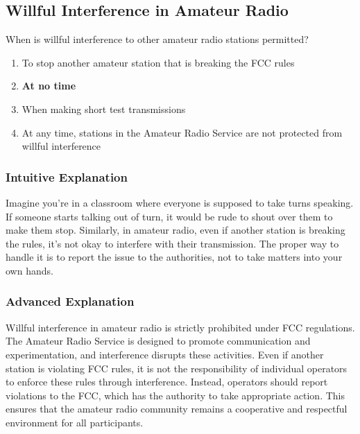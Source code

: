 \subsection{Willful Interference in Amateur Radio}
\label{T1A11}

\begin{tcolorbox}[colback=gray!10!white,colframe=black!75!black,title=T1A11]
When is willful interference to other amateur radio stations permitted?
\begin{enumerate}[label=\Alph*,noitemsep]
    \item To stop another amateur station that is breaking the FCC rules
    \item \textbf{At no time}
    \item When making short test transmissions
    \item At any time, stations in the Amateur Radio Service are not protected from willful interference
\end{enumerate}
\end{tcolorbox}

\subsubsection*{Intuitive Explanation}
Imagine you're in a classroom where everyone is supposed to take turns speaking. If someone starts talking out of turn, it would be rude to shout over them to make them stop. Similarly, in amateur radio, even if another station is breaking the rules, it's not okay to interfere with their transmission. The proper way to handle it is to report the issue to the authorities, not to take matters into your own hands.

\subsubsection*{Advanced Explanation}
Willful interference in amateur radio is strictly prohibited under FCC regulations. The Amateur Radio Service is designed to promote communication and experimentation, and interference disrupts these activities. Even if another station is violating FCC rules, it is not the responsibility of individual operators to enforce these rules through interference. Instead, operators should report violations to the FCC, which has the authority to take appropriate action. This ensures that the amateur radio community remains a cooperative and respectful environment for all participants.